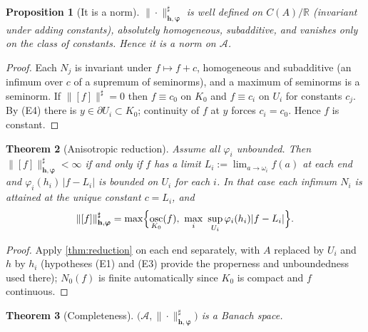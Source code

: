 \documentclass[11pt,a4paper]{article}
\numberwithin{equation}{section}
\theoremstyle{plain}
\newtheorem{theorem}{Theorem}[section]
\newtheorem{proposition}[theorem]{Proposition}
\theoremstyle{definition}
\theoremstyle{remark}
\newcommand{\R}{\mathbb{R}}
\DeclareMathOperator{\osc}{osc}
\begin{document}
\begin{proposition}[It is a norm]\label{prop:aniso-is-norm}
$\|\cdot\|^{\sharp}_{\mathbf{h},\boldsymbol{\varphi}}$ is well defined on $C(A)/\R$
(invariant under adding constants), absolutely homogeneous, subadditive, and vanishes
only on the class of constants. Hence it is a norm on $\mathcal{A}$.
\end{proposition}

\begin{proof}
Each $N_j$ is invariant under $f\mapsto f+c$, homogeneous and subadditive (an infimum over
$c$ of a supremum of seminorms), and a maximum of seminorms is a seminorm. If
$\|[f]\|^{\sharp}=0$ then $f\equiv c_0$ on $K_0$ and $f\equiv c_i$ on $U_i$ for constants
$c_j$. By (E4) there is $y\in\partial U_i\subset K_0$; continuity of $f$ at $y$ forces
$c_i=c_0$. Hence $f$ is constant.
\end{proof}

\begin{theorem}[Anisotropic reduction]\label{thm:aniso-reduction}
Assume all $\varphi_i$ unbounded. Then $\|[f]\|^{\sharp}_{\mathbf{h},\boldsymbol{\varphi}}<\infty$
if and only if $f$ has a limit $L_i:=\lim_{a\to\omega_i}f(a)$ at each end and
$\varphi_i(h_i)\,|f-L_i|$ is bounded on $U_i$ for each $i$. In that case each infimum
$N_i$ is attained at the unique constant $c=L_i$, and
\[
\|[f]\|^{\sharp}_{\mathbf{h},\boldsymbol{\varphi}}
=\max\Bigl\{\osc_{K_0}(f),\ \max_{i}\ \sup_{U_i}\varphi_i(h_i)|f-L_i|\Bigr\}.
\]
\end{theorem}

\begin{proof}
Apply \cref{thm:reduction} on each end separately, with $A$ replaced by $U_i$ and $h$ by
$h_i$ (hypotheses (E1) and (E3) provide the properness and unboundedness used there);
$N_0(f)$ is finite automatically since $K_0$ is compact and $f$ continuous.
\end{proof}

\begin{theorem}[Completeness]\label{thm:aniso-complete}
$\bigl(\mathcal{A},\|\cdot\|^{\sharp}_{\mathbf{h},\boldsymbol{\varphi}}\bigr)$
is a Banach space.
\end{theorem}
\end{document}
